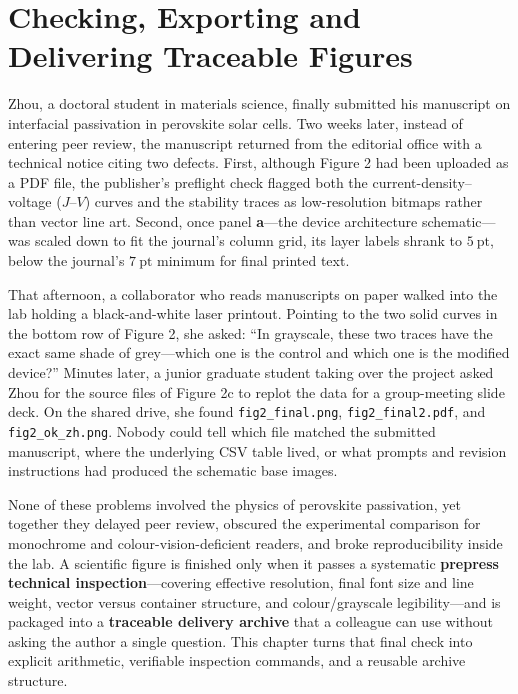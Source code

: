 \chapter{Checking, Exporting and Delivering Traceable Figures}

Zhou, a doctoral student in materials science, finally submitted his manuscript on interfacial passivation in perovskite solar cells. Two weeks later, instead of entering peer review, the manuscript returned from the editorial office with a technical notice citing two defects. First, although Figure 2 had been uploaded as a PDF file, the publisher's preflight check flagged both the current-density--voltage ($J\text{--}V$) curves and the stability traces as low-resolution bitmaps rather than vector line art. Second, once panel \textbf{a}---the device architecture schematic---was scaled down to fit the journal's column grid, its layer labels shrank to $5\ \text{pt}$, below the journal's $7\ \text{pt}$ minimum for final printed text.

That afternoon, a collaborator who reads manuscripts on paper walked into the lab holding a black-and-white laser printout. Pointing to the two solid curves in the bottom row of Figure 2, she asked: ``In grayscale, these two traces have the exact same shade of grey---which one is the control and which one is the modified device?'' Minutes later, a junior graduate student taking over the project asked Zhou for the source files of Figure 2c to replot the data for a group-meeting slide deck. On the shared drive, she found \texttt{fig2\_final.png}, \texttt{fig2\_final2.pdf}, and \texttt{fig2\_ok\_zh.png}. Nobody could tell which file matched the submitted manuscript, where the underlying CSV table lived, or what prompts and revision instructions had produced the schematic base images.

None of these problems involved the physics of perovskite passivation, yet together they delayed peer review, obscured the experimental comparison for monochrome and colour-vision-deficient readers, and broke reproducibility inside the lab. A scientific figure is finished only when it passes a systematic \textbf{prepress technical inspection}---covering effective resolution, final font size and line weight, vector versus container structure, and colour/grayscale legibility---and is packaged into a \textbf{traceable delivery archive} that a colleague can use without asking the author a single question. This chapter turns that final check into explicit arithmetic, verifiable inspection commands, and a reusable archive structure.

